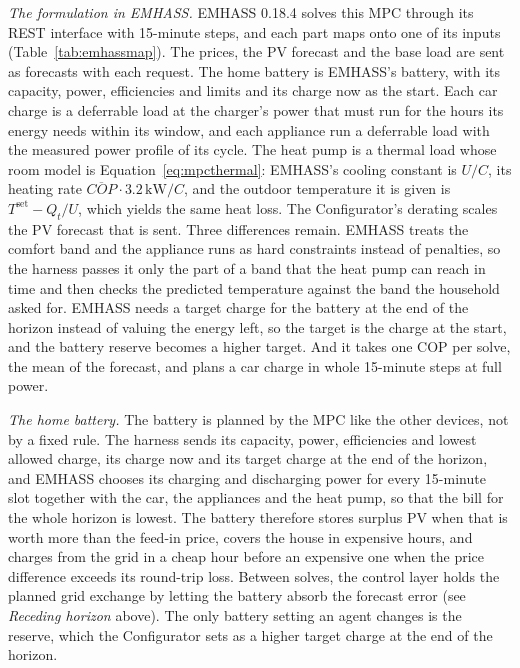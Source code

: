 \textit{The formulation in EMHASS.} EMHASS 0.18.4 solves this MPC
through its REST interface with 15-minute steps, and each part maps onto
one of its inputs (Table~\ref{tab:emhassmap}). The prices, the PV forecast and the base load are
sent as forecasts with each request. The home battery is EMHASS's
battery, with its capacity, power, efficiencies and limits and its
charge now as the start. Each car charge is a deferrable load at the
charger's power that must run for the hours its energy needs within its
window, and each appliance run a deferrable load with the measured
power profile of its cycle. The heat pump is a thermal load whose room
model is Equation~\ref{eq:mpcthermal}: EMHASS's cooling constant is
$U/C$, its heating rate $\overline{\mathit{COP}}\cdot 3.2\,\mathrm{kW}/C$,
and the outdoor temperature it is given is
$T^{\mathrm{set}} - Q_t/U$, which yields the same heat loss. The
Configurator's derating scales the PV forecast that is sent. Three
differences remain. EMHASS treats the comfort band and the appliance
runs as hard constraints instead of penalties, so the harness passes it
only the part of a band that the heat pump can reach in time and then
checks the predicted temperature against the band the household asked
for. EMHASS needs a target charge for the battery at the end of the
horizon instead of valuing the energy left, so the target is the charge
at the start, and the battery reserve becomes a higher target. And it
takes one COP per solve, the mean of the forecast, and plans a car
charge in whole 15-minute steps at full power.

\textit{The home battery.} The battery is planned by the MPC like the
other devices, not by a fixed rule. The harness sends its capacity,
power, efficiencies and lowest allowed charge, its charge now and its
target charge at the end of the horizon, and EMHASS chooses its
charging and discharging power for every 15-minute slot together with
the car, the appliances and the heat pump, so that the bill for the
whole horizon is lowest. The battery therefore stores surplus PV when
that is worth more than the feed-in price, covers the house in
expensive hours, and charges from the grid in a cheap hour before an
expensive one when the price difference exceeds its round-trip loss.
Between solves, the control layer holds the planned grid exchange by
letting the battery absorb the forecast error (see \textit{Receding
horizon} above). The only battery setting an agent changes is the
reserve, which the Configurator sets as a higher target charge at the
end of the horizon.


